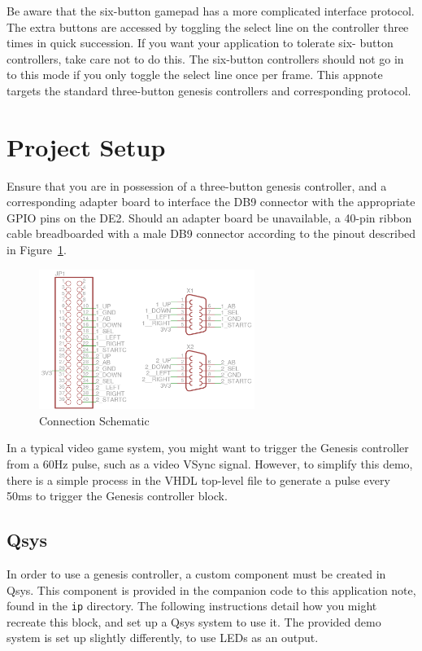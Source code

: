 \documentclass{capstonedoc}
\begin{document}
Be aware that the six-button gamepad has a more complicated interface protocol.
The extra buttons are accessed by toggling the select line on the controller
three times in quick succession. If you want your application to tolerate six-
button controllers, take care not to do this. The six-button controllers should
not go in to this mode if you only toggle the select line once per frame.
This appnote targets the standard three-button genesis controllers and 
corresponding protocol.

\section{Project Setup}
Ensure that you are in possession of a three-button genesis controller, and a 
corresponding adapter board to interface the DB9 connector with the appropriate 
GPIO pins on the DE2. Should an adapter board be unavailable, a 40-pin ribbon 
cable breadboarded with a male DB9 connector according to the pinout described 
in Figure~\ref{fig:schematic}.

\begin{figure}[h]
  \centering
  \includegraphics[width=7cm]{schematic}
  \caption{Connection Schematic}
  \label{fig:schematic}
\end{figure}

In a typical video game system, you might want to trigger the Genesis controller
from a 60Hz pulse, such as a video VSync signal. However, to simplify this demo,
there is a simple process in the VHDL top-level file to generate a pulse
every 50ms to trigger the Genesis controller block.

\subsection{Qsys}

In order to use a genesis controller, a custom component must be created in
Qsys. This component is provided in the companion code to this application note,
found in the \texttt{ip} directory. The following instructions detail how you
might recreate this block, and set up a Qsys system to use it. The provided demo
system is set up slightly differently, to use LEDs as an output.
\end{document}
